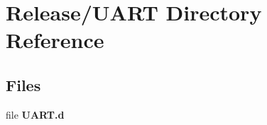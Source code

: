 \section{Release/\+U\+A\+R\+T Directory Reference}
\label{dir_65e5c1d26ec16c85d95ecbd4d9107f5c}
\subsection*{Files}
\begin{DoxyCompactItemize}
\item 
file {\bfseries U\+A\+R\+T.\+d}
\end{DoxyCompactItemize}
